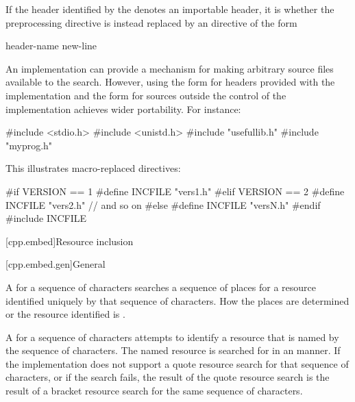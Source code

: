\pnum
If the header identified by the 
denotes an importable header,
it is
whether the  preprocessing directive
is instead replaced by an  directive of the form
\begin{ncbnf}
 header-name \terminal{;} new-line
\end{ncbnf}

\pnum
\begin{note}
An implementation can provide a mechanism for making arbitrary
source files available to the \tcode{< >} search.
However, using the \tcode{< >} form for headers provided
with the implementation and the  form for sources
outside the control of the implementation
achieves wider portability. For instance:

\begin{codeblock}
#include <stdio.h>
#include <unistd.h>
#include "usefullib.h"
#include "myprog.h"
\end{codeblock}

\end{note}

\pnum
\begin{example}
This illustrates macro-replaced
directives:

\begin{codeblock}
#if VERSION == 1
    #define INCFILE  "vers1.h"
#elif VERSION == 2
    #define INCFILE  "vers2.h"  // and so on
#else
    #define INCFILE  "versN.h"
#endif
#include INCFILE
\end{codeblock}
\end{example}

[cpp.embed]{Resource inclusion}
%

[cpp.embed.gen]{General}

\pnum
A  for a sequence of characters
searches a sequence of places for a resource identified uniquely
by that sequence of characters.
How the places are determined or the resource identified
is .

\pnum
A  for a sequence of characters
attempts to identify a resource that is named by the sequence of characters.
The named resource is searched for
in an  manner.
If the implementation does not support a quote resource search
for that sequence of characters, or if the search fails,
the result of the quote resource search
is the result of a bracket resource search for the same sequence of characters.

